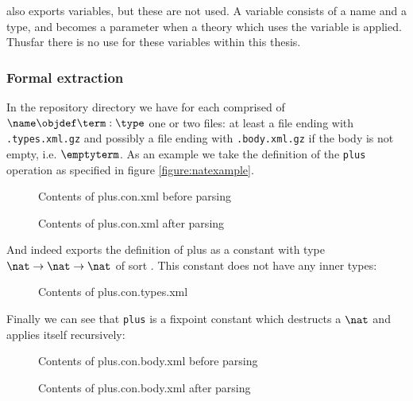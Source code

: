 \coq also exports variables, but these are not used.
A variable consists of a name and a type, and becomes a parameter when a theory which uses the variable is applied.
Thusfar there is no use for these variables within this thesis.

\subsubsection{Formal extraction}
In the repository \xml directory we have for each \coqobj[s] comprised of $\name \objdef \term : \type$
one or two files: at least a file ending with \lstinline{.types.xml.gz} and
possibly a file ending with \lstinline{.body.xml.gz} if the body is not empty, i.e. $\emptyterm$.
As an example we take the definition of the \texttt{plus} operation as specified in figure \ref{figure:natexample}.

\begin{figure}[H]
\centering

\caption{Contents of plus.con.xml before parsing}
\end{figure}

\begin{figure}[H]
  \centering
  
  \caption{Contents of plus.con.xml after parsing}
\end{figure}

And indeed \coq exports the definition of plus as a constant with type $\nat \rightarrow \nat \rightarrow \nat$ of sort \sortset.
This constant does not have any inner types:

\begin{figure}[H]
\centering

\caption{Contents of plus.con.types.xml}
\end{figure}

Finally we can see that \texttt{plus} is a fixpoint constant which destructs a $\nat$ and applies itself recursively:

\begin{figure}[H]
\centering

\caption{Contents of plus.con.body.xml before parsing}
\end{figure}

\begin{figure}[H]
  \centering
  
  \caption{Contents of plus.con.body.xml after parsing}
  \end{figure}

